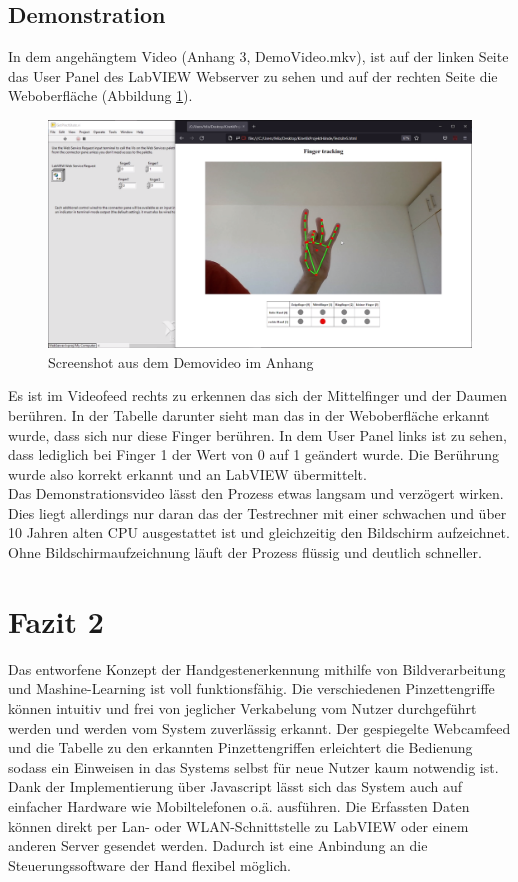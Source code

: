 \documentclass[a4paper,12pt,final]{article} %
\numberwithin{equation}{section} %
\numberwithin{figure}{section} %
\numberwithin{table}{section} %
\begin{document}
\subsection{Demonstration}
In dem angehängtem Video (Anhang 3, DemoVideo.mkv), ist auf der linken Seite das User Panel des LabVIEW Webserver zu sehen und auf der rechten Seite die Weboberfläche (Abbildung \ref{fig:ScreenshotVideo}).
\begin{figure}[H]
	\begin{center}
		\includegraphics[width=12cm]{Bilder/ScreenshotVideo.png}
		\caption{Screenshot aus dem Demovideo im Anhang}
		\label{fig:ScreenshotVideo}
	\end{center}
\end{figure}
Es ist im Videofeed rechts zu erkennen das sich der Mittelfinger und der Daumen berühren. In der Tabelle darunter sieht man das in der Weboberfläche erkannt wurde, dass sich nur diese Finger berühren.
In dem User Panel links ist zu sehen, dass lediglich bei Finger 1 der Wert von 0 auf 1 geändert wurde. Die Berührung wurde also korrekt erkannt und an LabVIEW übermittelt.\\
Das Demonstrationsvideo lässt den Prozess etwas langsam und verzögert wirken. Dies liegt allerdings nur daran das der Testrechner mit einer schwachen und über 10 Jahren alten CPU ausgestattet ist und gleichzeitig den Bildschirm aufzeichnet. 
Ohne Bild\-schirm\-auf\-zeich\-nung läuft der Prozess flüssig und deutlich schneller. 
\newpage

\section{Fazit 2}
Das entworfene Konzept der Handgestenerkennung mithilfe von Bildverarbeitung und Mashine-Learning ist voll funktionsfähig. 
Die verschiedenen Pinzetten\-griffe können intuitiv und frei von jeglicher Verkabelung vom Nutzer durchgeführt werden und werden vom System zuverlässig erkannt. 
Der gespiegelte Webcamfeed und die Tabelle zu den erkannten Pinzettengriffen erleichtert die Bedienung sodass ein Einweisen in das Systems selbst für neue Nutzer kaum notwendig ist.
Dank der Implementierung über Javascript lässt sich das System auch auf einfacher Hardware wie Mobiltelefonen o.ä. ausführen. 
Die Erfassten Daten können direkt per Lan- oder WLAN-Schnittstelle zu LabVIEW  oder einem anderen Server gesendet werden. Dadurch ist eine Anbindung an die Steuerungssoftware der Hand flexibel möglich.
\end{document}
